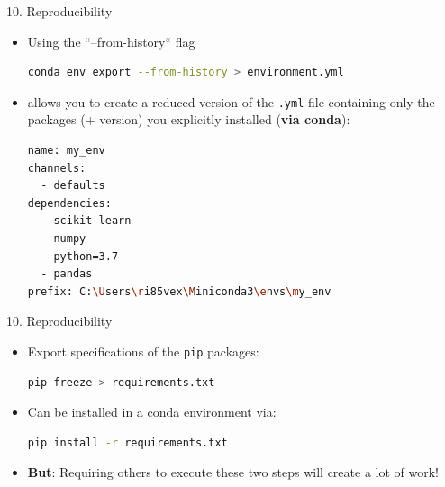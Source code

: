 \documentclass[11pt,compress,t,notes=noshow, xcolor=table]{beamer}
\begin{document}

\begin{vbframe}{10. Reproducibility}

\vfill

\begin{itemize}
	\item Using the ``--from-history`` flag
		\begin{lstlisting}[language=bash]
conda env export --from-history > environment.yml
		\end{lstlisting}
	\item allows you to create a reduced version of the \texttt{.yml}-file containing only the packages (+ version) you explicitly installed (\textbf{via conda}):  
		\begin{lstlisting}[language=bash]
name: my_env
channels:
  - defaults
dependencies:
  - scikit-learn
  - numpy
  - python=3.7
  - pandas
prefix: C:\Users\ri85vex\Miniconda3\envs\my_env
		\end{lstlisting}
\end{itemize}

\vfill

\end{vbframe}


\begin{vbframe}{10. Reproducibility}

\vfill

\begin{itemize}
	\item Export specifications of the \texttt{pip} packages:
		\begin{lstlisting}[language=bash]
pip freeze > requirements.txt
		\end{lstlisting}
	\item Can be installed in a conda environment via:
		\begin{lstlisting}[language=bash]
pip install -r requirements.txt
		\end{lstlisting}
	\item \textbf{But}: Requiring others to execute these two steps will create a lot of work!
\end{itemize}

\vfill

\end{vbframe}

\end{document}

